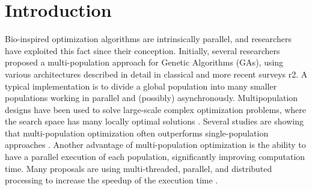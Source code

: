 \documentclass[runningheads]{llncs}
\begin{document}
\section{Introduction}


Bio-inspired optimization algorithms are intrinsically parallel, and researchers
have exploited this fact since their conception. Initially, several researchers
proposed a multi-population approach for Genetic Algorithms (GAs), using various
architectures described in detail in classical \cite{r1} and more recent surveys
{r2}. A typical implementation is to divide a global population into many
smaller populations working in parallel and (possibly) asynchronously.
Multipopulation designs have been used to solve large-scale complex optimization
problems, where the search space has many locally optimal solutions \cite{a1}.
Several studies are showing that multi-population optimization often outperforms
single-population approaches \cite{b11} \cite{b12}. Another advantage of
multi-population optimization is the ability to have a parallel execution of
each population, significantly improving computation time. Many proposals are
using multi-threaded, parallel, and distributed processing to increase the
speedup of the execution time \cite{b13} \cite{b14}.

\end{document}
